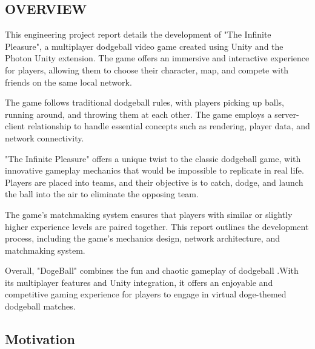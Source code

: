 \documentclass[12pt]{report}
\begin{document}
\subsection{OVERVIEW}

\justifying
\setlength{\parindent}{4em}
\setlength{\parskip}{0.5em}
\renewcommand{\baselinestretch}{1.5}

\normalsize
\hspace{1.7cm}
This engineering project report details the development of "The Infinite Pleasure", a multiplayer dodgeball video game created using Unity and the Photon Unity extension. The game offers an immersive and interactive experience for players, allowing them to choose their character, map, and compete with friends on the same local network.

The game follows traditional dodgeball rules, with players picking up balls, running around, and throwing them at each other. The game employs a server-client relationship to handle essential concepts such as rendering, player data, and network connectivity.

"The Infinite Pleasure" offers a unique twist to the classic dodgeball game, with innovative gameplay mechanics that would be impossible to replicate in real life. Players are placed into teams, and their objective is to catch, dodge, and launch the ball into the air to eliminate the opposing team.

The game's matchmaking system ensures that players with similar or slightly higher experience levels are paired together. This report outlines the development process, including the game's mechanics design, network architecture, and matchmaking system.

Overall, "DogeBall" combines the fun and chaotic gameplay of dodgeball .With its multiplayer features and Unity integration, it offers an enjoyable and competitive gaming experience for players to engage in virtual doge-themed dodgeball matches.




\clearpage

\raggedright
\subsection{ Motivation}
\end{document}
